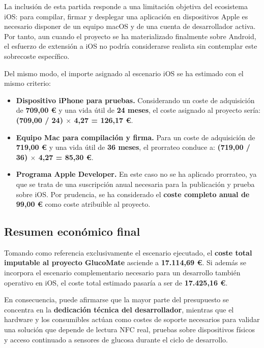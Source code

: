 La inclusión de esta partida responde a una limitación objetiva del ecosistema iOS: para
compilar, firmar y desplegar una aplicación en dispositivos Apple es necesario disponer de un
equipo macOS y de una cuenta de desarrollador activa. Por tanto, aun cuando el proyecto se ha
materializado finalmente sobre Android, el esfuerzo de extensión a iOS no podría considerarse
realista sin contemplar este sobrecoste específico.

Del mismo modo, el importe asignado al escenario iOS se ha estimado con el mismo criterio:

\begin{itemize}
    \item \textbf{Dispositivo iPhone para pruebas.} Considerando un coste de adquisición de
          \textbf{709,00 \euro{}} y una vida útil de \textbf{24 meses}, el coste asignado al
          proyecto sería:
          \textbf{(709,00 / 24) $\times$ 4,27 = 126,17 \euro{}}.
    \item \textbf{Equipo Mac para compilación y firma.} Para un coste de adquisición de
          \textbf{719,00 \euro{}} y una vida útil de \textbf{36 meses}, el prorrateo conduce a:
          \textbf{(719,00 / 36) $\times$ 4,27 = 85,30 \euro{}}.
    \item \textbf{Programa Apple Developer.} En este caso no se ha aplicado prorrateo, ya que
          se trata de una suscripción anual necesaria para la publicación y prueba sobre iOS.
          Por prudencia, se ha considerado el \textbf{coste completo anual de 99,00 \euro{}}
          como coste atribuible al proyecto.
\end{itemize}

\subsection{Resumen económico final}

Tomando como referencia exclusivamente el escenario ejecutado, el \textbf{coste total imputable
al proyecto GlucoMate} asciende a \textbf{17.114,69 \euro{}}. Si además se incorpora el
escenario complementario necesario para un desarrollo también operativo en iOS, el coste total
estimado pasaría a ser de \textbf{17.425,16 \euro{}}.

En consecuencia, puede afirmarse que la mayor parte del presupuesto se concentra en la
\textbf{dedicación técnica del desarrollador}, mientras que el hardware y los consumibles actúan
como costes de soporte necesarios para validar una solución que depende de lectura NFC real,
pruebas sobre dispositivos físicos y acceso continuado a sensores de glucosa durante el ciclo
de desarrollo.

